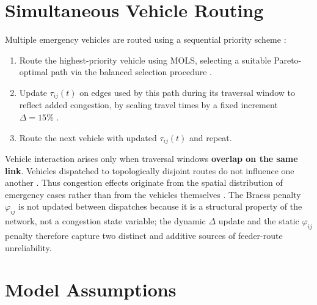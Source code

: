 \documentclass[paper=A4, 12pt, mathscr]{report}
\begin{document}
	\section{Simultaneous Vehicle Routing}
	
	Multiple emergency vehicles are routed using a sequential priority
	scheme \cite{12,14,humagain}:
	\begin{enumerate}
		\item Route the highest-priority vehicle using MOLS, selecting a
		suitable Pareto-optimal path via the balanced selection
		procedure \cite{7}.
		\item Update $\tau_{ij}(t)$ on edges used by this path during its
		traversal window to reflect added congestion, by scaling
		travel times by a fixed increment $\Delta=15\%$
		\cite{yan2021,13,humagain}.
		\item Route the next vehicle with updated $\tau_{ij}(t)$ and repeat.
	\end{enumerate}
	
	Vehicle interaction arises only when traversal windows \textbf{overlap
		on the same link}. Vehicles dispatched to topologically disjoint routes
	do not influence one another \cite{12}. Thus congestion effects originate
	from the spatial distribution of emergency cases rather than from the
	vehicles themselves \cite{7}. The Braess penalty $\varphi_{ij}$ is
	not updated between dispatches because it is a structural property of the
	network, not a congestion state variable; the dynamic $\Delta$ update
	and the static $\varphi_{ij}$ penalty therefore capture two distinct and
	additive sources of feeder-route unreliability.
	
	\section{Model Assumptions}
	
\end{document}
